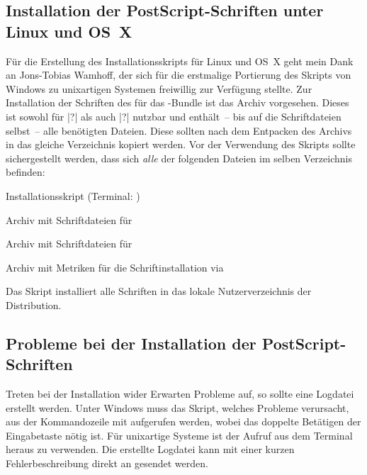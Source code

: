 \subsection{Installation der PostScript-Schriften unter Linux und OS~X}
\label{sec:install:fonts:unix}
Für die Erstellung des Installationsskripts für Linux und OS~X geht mein Dank 
an Jons-Tobias Wamhoff, der sich für die erstmalige Portierung des Skripts 
von Windows zu unixartigen Systemen freiwillig zur Verfügung stellte.
Zur Installation der Schriften des \CDs für das \TUDScript-Bundle ist das Archiv
%
{} vorgesehen. Dieses ist sowohl für 
|?| als auch |?| 
nutzbar und enthält~-- bis auf die Schriftdateien selbst~-- alle benötigten 
Dateien. Diese sollten nach dem Entpacken des Archivs in das gleiche 
Verzeichnis kopiert werden. Vor der Verwendung des Skripts 
 sollte sichergestellt werden, dass sich 
\emph{alle} der folgenden Dateien im selben Verzeichnis befinden:
%
\settowidth{}%
\begin{description}[labelwidth=\tempdim,labelsep=1em]
  \item[\File{tudscrfonts\_install.sh}]Installationsskript
    (Terminal: )
  \item[\File{Univers\_PS.zip}]Archiv mit Schriftdateien für \Univers
  \item[\File{DIN\_Bd\_PS.zip}]Archiv mit Schriftdateien für \DIN
  \item[\File{tudscrfonts.zip}]Archiv mit Metriken für die
    Schriftinstallation via 
\end{description}
%
Das Skript installiert alle Schriften in das lokale Nutzerverzeichnis der 
Distribution.


\subsection{Probleme bei der Installation der PostScript-Schriften}
Treten bei der Installation wider Erwarten Probleme auf, so sollte eine 
Logdatei erstellt werden. Unter Windows muss das Skript, welches Probleme 
verursacht, aus der Kommandozeile mit
 aufgerufen werden, wobei das 
doppelte Betätigen der Eingabetaste nötig ist. Für unixartige Systeme 
ist der Aufruf  aus dem 
Terminal heraus zu verwenden. Die erstellte Logdatei kann mit einer kurzen 
Fehlerbeschreibung direkt an \Email{\tudscrmail} gesendet werden.



